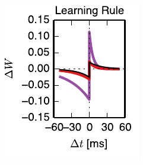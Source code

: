 \begin{figure}[t!]
\begin{subfigure}[T]{2.4in}
    \label{fig:fig4_add_nothr_trajectory}
  \end{subfigure}
  \begin{subfigure}[T]{1.45in}
    \includegraphics[width=\textwidth]{figures/ch4/fig4_add_thr_stdp_rule}    
    \label{fig:fig4_add_nothr_stdp_rule}
  \end{subfigure}
  \begin{subfigure}[T]{1.45in}
    \hspace{.1in}

\end{subfigure}
\end{figure}
